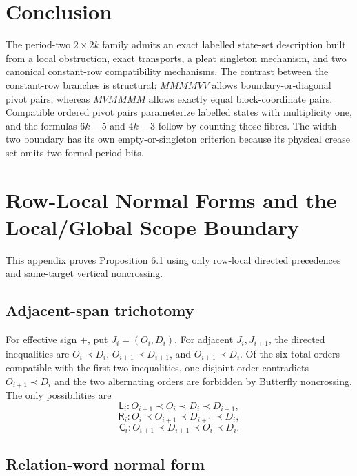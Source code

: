 \documentclass[11pt]{article}
\theoremstyle{definition}
\theoremstyle{remark}
\begin{document}
\section{Conclusion}
The period-two $2\times2k$ family admits an exact labelled state-set description built from a local obstruction, exact transports, a pleat singleton mechanism, and two canonical constant-row compatibility mechanisms. The contrast between the constant-row branches is structural: $MMMMVV$ allows boundary-or-diagonal pivot pairs, whereas $MVMMMM$ allows exactly equal block-coordinate pairs. Compatible ordered pivot pairs parameterize labelled states with multiplicity one, and the formulas $6k-5$ and $4k-3$ follow by counting those fibres. The width-two boundary has its own empty-or-singleton criterion because its physical crease set omits two formal period bits.



\appendix
\section{Row-Local Normal Forms and the Local/Global Scope Boundary}\label{appendix-a.-row-local-normal-forms-and-the-localglobal-scope-boundary}

This appendix proves Proposition 6.1 using only row-local directed
precedences and same-target vertical noncrossing.

\subsection{Adjacent-span
trichotomy}\label{a.1.-adjacent-span-trichotomy}

For effective sign \(+\), put \(J_i=(O_i,D_i)\). For adjacent
\(J_i,J_{i+1}\), the directed inequalities are \(O_i\prec D_i\),
\(O_{i+1}\prec D_{i+1}\), and \(O_{i+1}\prec D_i\). Of the six total
orders compatible with the first two inequalities, one disjoint order
contradicts \(O_{i+1}\prec D_i\) and the two alternating orders are
forbidden by Butterfly noncrossing. The only possibilities are \[
\mathsf{L}_i: O_{i+1}\prec O_i\prec D_i\prec D_{i+1},
\] \[
\mathsf{R}_i: O_i\prec O_{i+1}\prec D_{i+1}\prec D_i,
\] \[
\mathsf{C}_i: O_{i+1}\prec D_{i+1}\prec O_i\prec D_i.
\]

\subsection{Relation-word normal
form}\label{a.2.-relation-word-normal-form}
\end{document}
